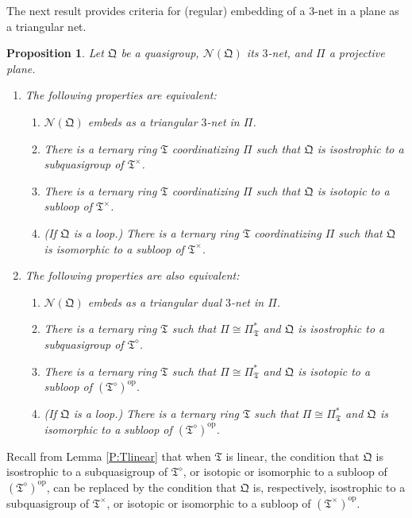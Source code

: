 \documentclass[reqno,12pt]{amsart}
\newtheorem{prop}[thm]{Proposition}
\theoremstyle{remark}
\numberwithin{equation}{section}
\numberwithin{figure}{section}
\newcommand \opp{^\mathrm{op}}
\newcommand \cN{\mathcal{N}}
\newcommand \fQ{\mathfrak Q}
\newcommand \fT{\mathfrak T}
\newcommand\PP{\Pi}	%
\begin{document}
The next result provides criteria for (regular) embedding of a $3$-net in a plane as a triangular net.

\begin{prop} \label{L:trinet}
Let $\fQ$ be a quasigroup, $\cN(\fQ)$ its $3$-net, and $\PP$ a projective plane.
\begin{enumerate}[{\rm(I)}]

\item The following properties are equivalent:
%
\begin{enumerate}[{\rm(a)}]
\item $\cN(\fQ)$ embeds as a triangular $3$-net in $\PP$.
\item There is a ternary ring $\fT$ coordinatizing $\PP$ such that $\fQ$ is isostrophic to a subquasigroup of $\fT^\times$.
\item There is a ternary ring $\fT$ coordinatizing $\PP$ such that $\fQ$ is isotopic to a subloop of $\fT^\times$.
\item (If $\fQ$ is a loop.)  There is a ternary ring $\fT$ coordinatizing $\PP$ such that $\fQ$ is isomorphic to a subloop of $\fT^\times$.
\end{enumerate}
%

\item The following properties are also equivalent:
%
\begin{enumerate}[{\rm(a$^*$)}]
\item $\cN(\fQ)$ embeds as a triangular dual $3$-net in $\PP$.
\item There is a ternary ring $\fT$ such that $\PP \cong \PP_\fT^*$ and $\fQ$ is isostrophic to a subquasigroup of $\fT^\diamond$.
\item There is a ternary ring $\fT$ such that $\PP \cong \PP_\fT^*$ and $\fQ$ is isotopic to a subloop of $(\fT^\diamond)\opp$.
\item (If $\fQ$ is a loop.)  There is a ternary ring $\fT$ such that $\PP \cong \PP_\fT^*$ and $\fQ$ is isomorphic to a subloop of $(\fT^\diamond)\opp$.
\end{enumerate}
%
\end{enumerate}
\end{prop}

Recall from Lemma \ref{P:Tlinear} that when $\fT$ is linear, the condition that $\fQ$ is isostrophic to a subquasigroup of $\fT^\diamond$, or isotopic or isomorphic to a subloop of $(\fT^\diamond)\opp$, can be replaced by the condition that $\fQ$ is, respectively, isostrophic to a subquasigroup of $\fT^\times$, or isotopic or isomorphic to a subloop of $(\fT^\times)\opp$.
\end{document}
